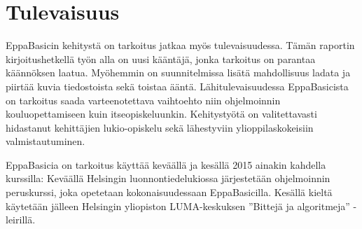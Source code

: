 \section{Tulevaisuus}
EppaBasicin kehitystä on tarkoitus
jatkaa myös tulevaisuudessa.
Tämän raportin kirjoitushetkellä työn alla
on uusi kääntäjä,
jonka tarkoitus on parantaa käännöksen laatua.
Myöhemmin on suunnitelmissa lisätä
mahdollisuus ladata ja piirtää kuvia tiedostoista
sekä toistaa ääntä.
Lähitulevaisuudessa EppaBasicista on tarkoitus
saada varteenotettava vaihtoehto niin ohjelmoinnin
kouluopettamiseen kuin itseopiskeluunkin.
Kehitystyötä on valitettavasti hidastanut kehittäjien
lukio-opiskelu sekä lähestyviin ylioppilaskokeisiin
valmistautuminen.

EppaBasicia on tarkoitus käyttää keväällä
ja kesällä 2015 ainakin kahdella kurssilla:
Keväällä Helsingin luonnontiedelukiossa
järjestetään ohjelmoinnin peruskurssi,
joka opetetaan kokonaisuudessaan
EppaBasicilla.
Kesällä kieltä käytetään jälleen
Helsingin yliopiston LUMA-keskuksen
''Bittejä ja algoritmeja'' -leirillä.